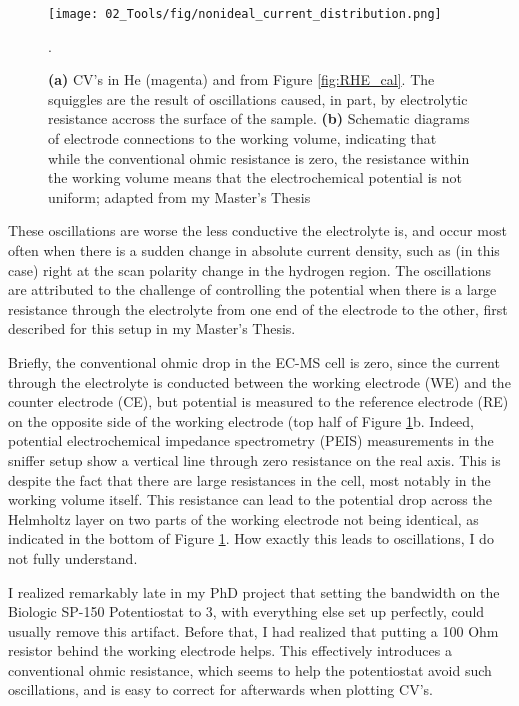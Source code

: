\begin{figure}[t]
	\texttt{[image: 02\_Tools/fig/nonideal\_current\_distribution.png]}
	\caption{\textbf{(a)} CV's in He (magenta) and  from Figure \ref{fig:RHE_cal}. The squiggles are the result of oscillations caused, in part, by electrolytic resistance accross the surface of the sample. \textbf{(b)} Schematic diagrams of electrode connections to the working volume, indicating that while the conventional ohmic resistance is zero, the resistance within the working volume means that the electrochemical potential is not uniform; adapted from my Master's Thesis\cite{Scott2016_MSc}}.
	\label{fig:current_distribution}
\end{figure}

These oscillations are worse the less conductive the electrolyte is, and occur most often when there is a sudden change in absolute current density, such as (in this case) right at the scan polarity change in the hydrogen region. The oscillations are attributed to the challenge of controlling the potential when there is a large resistance through the electrolyte from one end of the electrode to the other, first described for this setup in my Master's Thesis\cite{Scott2016_MSc}. 

Briefly, the conventional ohmic drop in the EC-MS cell is zero, since the current through the electrolyte is conducted between the working electrode (WE) and the counter electrode (CE), but potential is measured to the reference electrode (RE) on the opposite side of the working electrode (top half of Figure \ref{fig:current_distribution}b. Indeed, potential electrochemical impedance spectrometry (PEIS) measurements in the sniffer setup show a vertical line through zero resistance on the real axis. This is despite the fact that there are large resistances in the cell, most notably in the working volume itself. This resistance can lead to the potential drop across the Helmholtz layer on two parts of the working electrode not being identical, as indicated in the bottom of Figure \ref{fig:current_distribution}. How exactly this leads to oscillations, I do not fully understand.

I realized remarkably late in my PhD project that setting the bandwidth on the Biologic SP-150 Potentiostat to 3, with everything else set up perfectly, could usually remove this artifact. Before that, I had realized that putting a 100 Ohm resistor behind the working electrode helps. This effectively introduces a conventional ohmic resistance, which seems to help the potentiostat avoid such oscillations, and is easy to correct for afterwards when plotting CV's.

